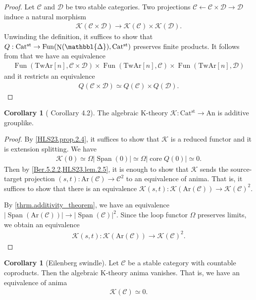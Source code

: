 \documentclass[a4paper,dvipdfmx,11pt,reqno]{amsart}
\DeclareMathOperator{\N}{N}
\DeclareMathOperator{\Fun}{Fun}
\newcommand{\C}{\mathcal{C}}
\newcommand{\D}{\mathcal{D}}
\newcommand{\K}{\mathcal{K}}
\DeclareMathOperator{\core}{core}
\DeclareMathOperator{\Span}{Span}
\newcommand{\An}{\mathrm{An}}
\newcommand{\Catst}{\mathrm{Cat^{st}}}
\newcommand{\Ar}{\mathrm{Ar}}
\newcommand{\TwAr}{\mathrm{TwAr}}
\newcommand{\prism}{{\mathlarger{\mathbbl{\Delta}}}}
\theoremstyle{definition}
\newtheorem{corollary}[theorem]{Corollary}
\begin{document}
\begin{proof}
  Let $\C$ and $\D$ be two stable categories.
  Two projections $\C \leftarrow \C \times \D \to \D$ induce a natural morphism
  \begin{align*}
    \K(\C \times \D) \to \K(\C) \times \K(\D).
  \end{align*}
  Unwinding the definition, it suffices to show that $Q : \Catst \to \Fun(\N(\prism),\Catst)$ preserves finite products.
  It follows from that we have an equivalence 
  \begin{align*}
    \Fun(\TwAr[n],\C \times \D) \times \Fun(\TwAr[n],\C) \times \Fun(\TwAr[n],\D)
  \end{align*}
  and it restricts an equivalence 
  \begin{align*}
    Q(\C \times \D) 
    \simeq Q(\C) \times Q(\D).
  \end{align*}
\end{proof}

\begin{corollary}[\cite{HLS23} Corollary 4.2] \label{HLS23.cor.4.2}
  The algebraic K-theory $\K : \Catst \to \An$ is additive grouplike.
\end{corollary}

\begin{proof}
  By \cref{HLS23.prop.2.4}, it suffices to show that $\K$ is a reduced functor and it is extension splitting.
  We have 
  \begin{align*}
    \K(0) \simeq \Omega|\Span(0)| \simeq \Omega|\core Q(0)| \simeq 0.
  \end{align*}
  Then by \cref{Ber.5.2.2,HLS23.lem.2.5}, it is enough to show that $\K$ sends the source-target projection $(s,t) : \Ar(\C) \to \C^2$ to an equivalence of anima.
  That is, it suffices to show that there is an equivalence $\K(s,t) : \K(\Ar(\C)) \to \K(\C)^2$.
  
  By \cref{thrm.additivity_theorem}, we have an equivalence $|\Span(\Ar(\C))| \to |\Span(\C)|^2$.
  Since the loop functor $\Omega$ preserves limits, we obtain an equivalence
  \begin{align*}
    \K(s,t) : \K(\Ar(\C)) \to \K(\C)^2.
  \end{align*}
\end{proof}

\begin{corollary}[Eilenberg swindle] \label{Ber.prop.A.4}
  Let $\C$ be a stable category with countable coproducts.
  Then the algebraic K-theory anima vanishes.
  That is, we have an equivalence of anima
  \begin{align*}
    \K(\C) \simeq 0.
  \end{align*}
\end{corollary}
\end{document}
